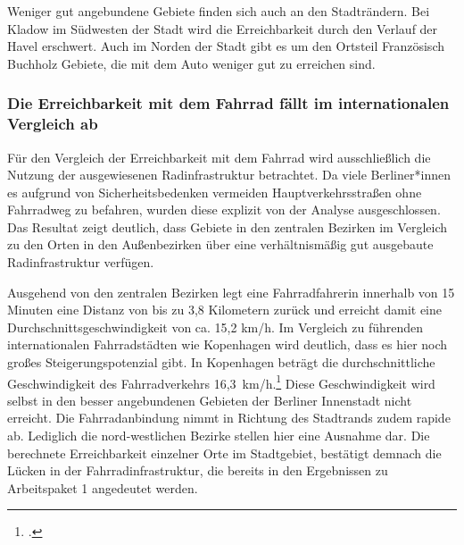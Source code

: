 Weniger gut angebundene Gebiete finden sich auch an den Stadträndern. Bei Kladow im Südwesten der Stadt wird die Erreichbarkeit durch den Verlauf der Havel erschwert. Auch im Norden der Stadt gibt es um den Ortsteil Französisch Buchholz Gebiete, die mit dem Auto weniger gut zu erreichen sind.

\subsubsection{Die Erreichbarkeit mit dem Fahrrad fällt im internationalen Vergleich ab}

Für den Vergleich der Erreichbarkeit mit dem Fahrrad wird ausschließlich die Nutzung der ausgewiesenen Radinfrastruktur betrachtet. Da viele Berliner*innen es aufgrund von Sicherheitsbedenken vermeiden Hauptverkehrsstraßen ohne Fahrradweg zu befahren, wurden diese explizit von der Analyse ausgeschlossen. Das Resultat zeigt deutlich, dass Gebiete in den zentralen Bezirken im Vergleich zu den Orten in den Außenbezirken über eine verhältnismäßig gut ausgebaute Radinfrastruktur verfügen.


Ausgehend von den zentralen Bezirken legt eine Fahrradfahrerin innerhalb von 15 Minuten eine Distanz von bis zu 3,8 Kilometern zurück und erreicht damit eine Durchschnittsgeschwindigkeit von ca. 15,2 km/h. Im Vergleich zu führenden internationalen Fahrradstädten wie Kopenhagen wird deutlich, dass es hier noch großes Steigerungspotenzial gibt. In Kopenhagen beträgt die durchschnittliche Geschwindigkeit des Fahrradverkehrs 16,3~km/h.\footcite{kopenhagen}
Diese Geschwindigkeit wird selbst in den besser angebundenen Gebieten der Berliner Innenstadt nicht erreicht. Die Fahrradanbindung nimmt in Richtung des Stadtrands zudem rapide ab. Lediglich die nord-westlichen Bezirke stellen hier eine Ausnahme dar. Die berechnete Erreichbarkeit einzelner Orte im Stadtgebiet, bestätigt demnach die Lücken in der Fahrradinfrastruktur, die bereits in den Ergebnissen zu Arbeitspaket 1 angedeutet werden.

